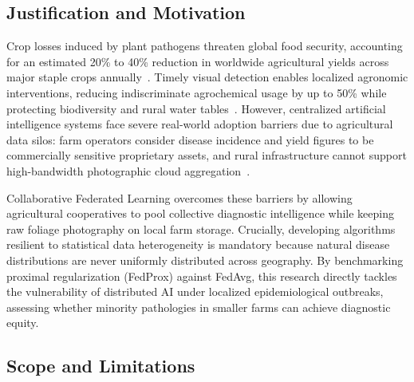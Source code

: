 \documentclass[applsci,article,submit,oneauthor,pdftex]{Definitions/mdpi}
\begin{document}
\subsection{Justification and Motivation}
Crop losses induced by plant pathogens threaten global food security, accounting for an estimated 20\% to 40\% reduction in worldwide agricultural yields across major staple crops annually~\cite{savary2019global}. Timely visual detection enables localized agronomic interventions, reducing indiscriminate agrochemical usage by up to 50\% while protecting biodiversity and rural water tables~\cite{fao2022automation}. However, centralized artificial intelligence systems face severe real-world adoption barriers due to agricultural data silos: farm operators consider disease incidence and yield figures to be commercially sensitive proprietary assets, and rural infrastructure cannot support high-bandwidth photographic cloud aggregation~\cite{li2021federated_agri}.

Collaborative Federated Learning overcomes these barriers by allowing agricultural cooperatives to pool collective diagnostic intelligence while keeping raw foliage photography on local farm storage. Crucially, developing algorithms resilient to statistical data heterogeneity is mandatory because natural disease distributions are never uniformly distributed across geography. By benchmarking proximal regularization (FedProx) against FedAvg, this research directly tackles the vulnerability of distributed AI under localized epidemiological outbreaks, assessing whether minority pathologies in smaller farms can achieve diagnostic equity.

\subsection{Scope and Limitations}
\end{document}
